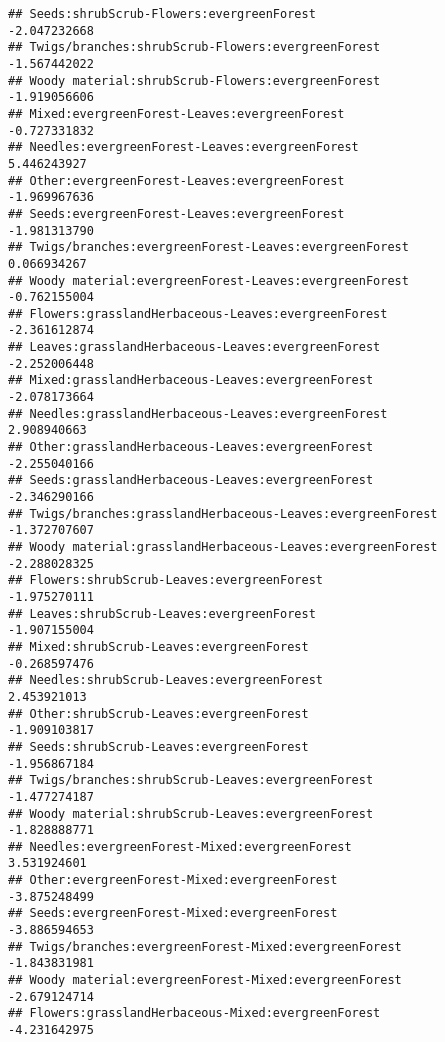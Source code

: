 \documentclass[
]{article}
\begin{document}
\begin{verbatim}
## Seeds:shrubScrub-Flowers:evergreenForest                              -2.047232668
## Twigs/branches:shrubScrub-Flowers:evergreenForest                     -1.567442022
## Woody material:shrubScrub-Flowers:evergreenForest                     -1.919056606
## Mixed:evergreenForest-Leaves:evergreenForest                          -0.727331832
## Needles:evergreenForest-Leaves:evergreenForest                         5.446243927
## Other:evergreenForest-Leaves:evergreenForest                          -1.969967636
## Seeds:evergreenForest-Leaves:evergreenForest                          -1.981313790
## Twigs/branches:evergreenForest-Leaves:evergreenForest                  0.066934267
## Woody material:evergreenForest-Leaves:evergreenForest                 -0.762155004
## Flowers:grasslandHerbaceous-Leaves:evergreenForest                    -2.361612874
## Leaves:grasslandHerbaceous-Leaves:evergreenForest                     -2.252006448
## Mixed:grasslandHerbaceous-Leaves:evergreenForest                      -2.078173664
## Needles:grasslandHerbaceous-Leaves:evergreenForest                     2.908940663
## Other:grasslandHerbaceous-Leaves:evergreenForest                      -2.255040166
## Seeds:grasslandHerbaceous-Leaves:evergreenForest                      -2.346290166
## Twigs/branches:grasslandHerbaceous-Leaves:evergreenForest             -1.372707607
## Woody material:grasslandHerbaceous-Leaves:evergreenForest             -2.288028325
## Flowers:shrubScrub-Leaves:evergreenForest                             -1.975270111
## Leaves:shrubScrub-Leaves:evergreenForest                              -1.907155004
## Mixed:shrubScrub-Leaves:evergreenForest                               -0.268597476
## Needles:shrubScrub-Leaves:evergreenForest                              2.453921013
## Other:shrubScrub-Leaves:evergreenForest                               -1.909103817
## Seeds:shrubScrub-Leaves:evergreenForest                               -1.956867184
## Twigs/branches:shrubScrub-Leaves:evergreenForest                      -1.477274187
## Woody material:shrubScrub-Leaves:evergreenForest                      -1.828888771
## Needles:evergreenForest-Mixed:evergreenForest                          3.531924601
## Other:evergreenForest-Mixed:evergreenForest                           -3.875248499
## Seeds:evergreenForest-Mixed:evergreenForest                           -3.886594653
## Twigs/branches:evergreenForest-Mixed:evergreenForest                  -1.843831981
## Woody material:evergreenForest-Mixed:evergreenForest                  -2.679124714
## Flowers:grasslandHerbaceous-Mixed:evergreenForest                     -4.231642975

\end{verbatim}
\end{document}

